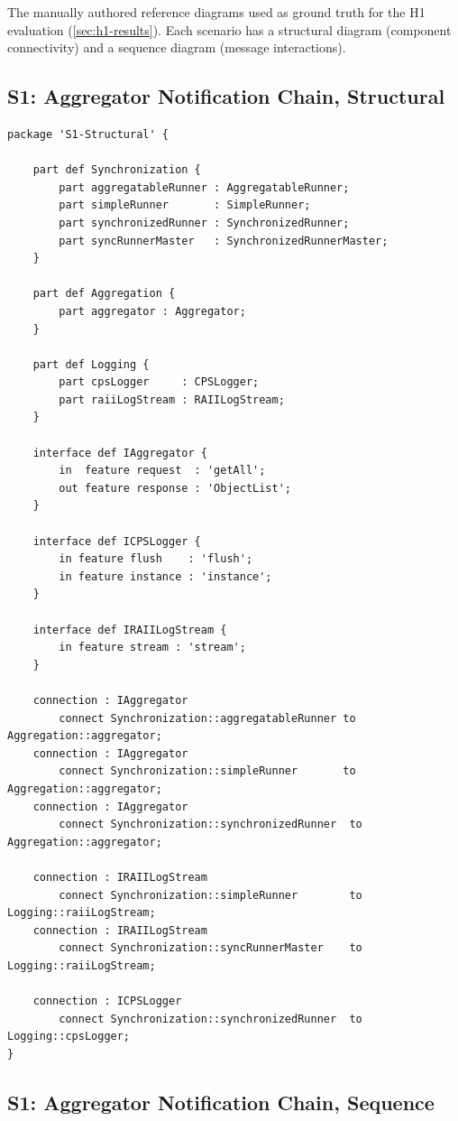 The manually authored \sysml reference diagrams used as ground truth
for the H1 evaluation (\cref{sec:h1-results}). Each scenario has a
structural diagram (component connectivity) and a sequence diagram
(message interactions).

\subsection{S1: Aggregator Notification Chain, Structural}

\begin{verbatim}
package 'S1-Structural' {

    part def Synchronization {
        part aggregatableRunner : AggregatableRunner;
        part simpleRunner       : SimpleRunner;
        part synchronizedRunner : SynchronizedRunner;
        part syncRunnerMaster   : SynchronizedRunnerMaster;
    }

    part def Aggregation {
        part aggregator : Aggregator;
    }

    part def Logging {
        part cpsLogger     : CPSLogger;
        part raiiLogStream : RAIILogStream;
    }

    interface def IAggregator {
        in  feature request  : 'getAll';
        out feature response : 'ObjectList';
    }

    interface def ICPSLogger {
        in feature flush    : 'flush';
        in feature instance : 'instance';
    }

    interface def IRAIILogStream {
        in feature stream : 'stream';
    }

    connection : IAggregator
        connect Synchronization::aggregatableRunner to Aggregation::aggregator;
    connection : IAggregator
        connect Synchronization::simpleRunner       to Aggregation::aggregator;
    connection : IAggregator
        connect Synchronization::synchronizedRunner  to Aggregation::aggregator;

    connection : IRAIILogStream
        connect Synchronization::simpleRunner        to Logging::raiiLogStream;
    connection : IRAIILogStream
        connect Synchronization::syncRunnerMaster    to Logging::raiiLogStream;

    connection : ICPSLogger
        connect Synchronization::synchronizedRunner  to Logging::cpsLogger;
}
\end{verbatim}

\subsection{S1: Aggregator Notification Chain, Sequence}


